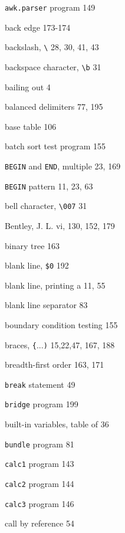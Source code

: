 \begin{multicols}{3}
\hangindent=4pc  \verb'awk.parser' program 149

\hangindent=4pc  back edge 173-174

\hangindent=4pc  backslash, \verb'\' 28, 30, 41, 43

\hangindent=4pc  backspace character, \verb'\b' 31

\hangindent=4pc  bailing out 4

\hangindent=4pc  balanced delimiters 77, 195

\hangindent=4pc  base table 106

\hangindent=4pc  batch sort test program 155

\hangindent=4pc  \verb'BEGIN' and \verb'END', multiple 23, 169

\hangindent=4pc  \verb'BEGIN' pattern 11, 23, 63

\hangindent=4pc  bell character, \verb'\007' 31

\hangindent=4pc  Bentley, J. L. vi, 130, 152, 179

\hangindent=4pc  binary tree 163

\hangindent=4pc  blank line, \verb'$0' 192

\hangindent=4pc  blank line, printing a 11, 55

\hangindent=4pc  blank line separator 83

\hangindent=4pc  boundary condition testing 155

\hangindent=4pc  braces, \verb'{'...\verb')' 15,22,47, 167, 188

\hangindent=4pc  breadth-first order 163, 171

\hangindent=4pc  \verb'break' statement 49

\hangindent=4pc  \verb'bridge' program 199

\hangindent=4pc  built-in variables, table of 36

\hangindent=4pc  \verb'bundle' program 81

\hangindent=4pc  \verb'calc1' program 143

\hangindent=4pc  \verb'calc2' program 144

\hangindent=4pc  \verb'calc3' program 146

\hangindent=4pc  call by reference 54


\end{multicols}
